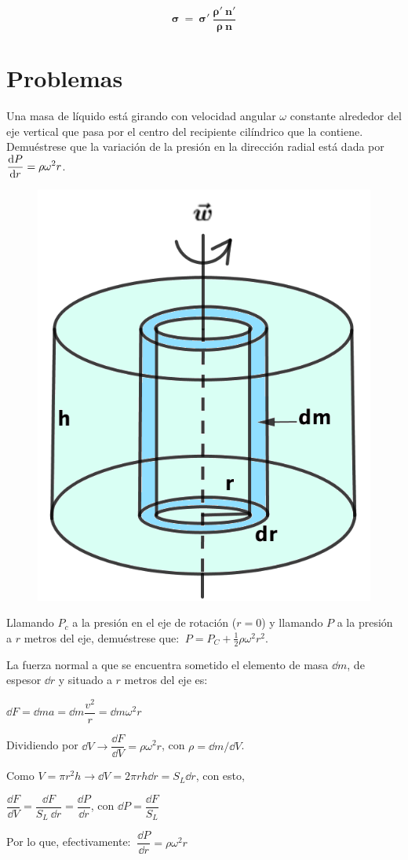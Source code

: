 $$\boldsymbol{ \sigma\ = \ \sigma' \ \dfrac{\rho'\ n'}{\rho\ n} }$$

\section{Problemas}
\begin{prob}
\begin{multicols}{2}
	Una masa de líquido está girando con velocidad angular $\omega$ constante alrededor del eje vertical que pasa por el centro del recipiente cilíndrico que la contiene. Demuéstrese que la variación de la presión en la dirección radial está dada por $\displaystyle \dv{P}{r}=\rho \omega^2 r$.
\begin{figure}[H]
	\centering
	\includegraphics[width=.35\textwidth]{imagenes/imagenes08/T08IM20.png}
\end{figure}
\end{multicols}

\vspace{-4mm} %
Llamando $P_c$ a la presión en el eje de rotación ($r=0$) y llamando $P$ a la presión a $r$ metros del eje, demuéstrese que: $\ P=P_C+\frac 1 2 \rho \omega^2 r^2$.
\end{prob}


La fuerza normal a que se encuentra sometido el elemento de masa $\dd m$, de espesor $\dd r$ y situado a $r$ metros del eje es:

$\dd F= \dd m a = \dd m \dfrac {v^2}{r}=\dd m \omega^2 r$

Dividiendo por $\dd V \to  \dfrac{\dd F}{\dd V}=\rho \omega^2 r$, con $\rho=\dd m / \dd V$.

Como $V=\pi r^2 h \to \dd V= 2 \pi r h \dd r=S_L \dd r$, con esto,

$\dfrac {\dd F}{\dd V}=\dfrac{\dd F}{S_L \ \dd r}=\dfrac{\dd P}{\dd r}$, con $\dd P=\dfrac{\dd F}{S_L}$

Por lo que, efectivamente: $\ \dfrac{\dd P}{\dd r}=\rho \omega^2 r$

